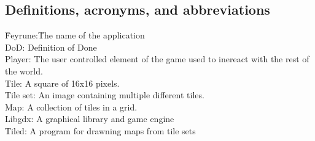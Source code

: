 \subsection{Definitions, acronyms, and abbreviations}
\begin{comment}
Create a word list to avoid confusion and give a definition of every abbreviation
you use in the document.
\end{comment}
\label{wordlist}
\begin{tabbing}
	\indent\= Feyrune:\indent\indent\= The name of the application\\
	\> DoD:\> Definition of Done\\
	\> Player:\> The user controlled element of the game used to inereact with the rest of the world.\\
	\> Tile:\> A square of 16x16 pixels.\\
	\> Tile set:\> An image containing multiple different tiles.\\
	\> Map:\> A collection of tiles in a grid.\\
	\> Libgdx:\> A graphical library and game engine\\
	\> Tiled:\> A program for drawning maps from tile sets\\
\end{tabbing}